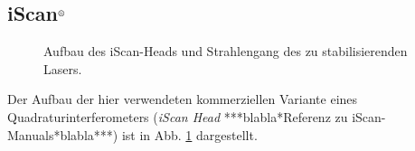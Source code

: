 \subsection{iScan$^\text{\textregistered}$}\label{subsec:iScan}
\begin{figure}[h]
 	\centering
	\caption[iScan-Head - Aufbau]{Aufbau
	des iScan-Heads und Strahlengang des zu
	stabilisierenden Lasers.}\label{fig:iscan_aufbau}
\end{figure}
Der Aufbau der hier verwendeten kommerziellen Variante eines
Quadraturinterferometers (\textit{iScan Head} ***blabla*Referenz zu
iScan-Manuals*blabla***) ist in Abb.
\ref{fig:iscan_aufbau} dargestellt.
